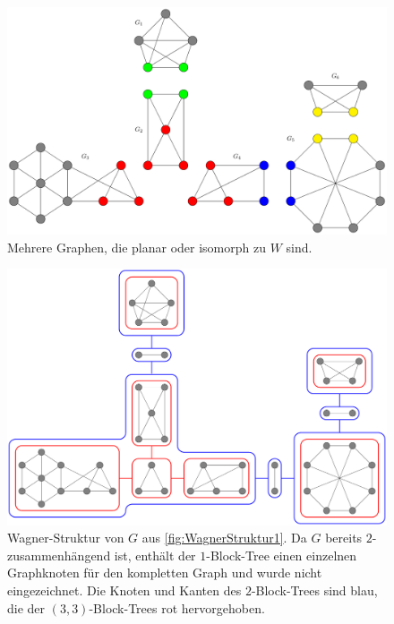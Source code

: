 \begin{figure}[H]
  \centering
  \includegraphics[width=\textwidth,height=\textheight,keepaspectratio]{bilder/WagnerTheorem2.pdf}
  \caption{Mehrere Graphen, die planar oder isomorph zu $W$ sind.}
  \label{fig:WagnerStruktur2}
\end{figure}

\begin{figure}[H]
  \centering
  \includegraphics[width=\textwidth,height=\textheight,keepaspectratio]{bilder/WagnerTheorem3.pdf}
  \caption{Wagner-Struktur von $G$ aus \Abb \ref{fig:WagnerStruktur1}.
           Da $G$ bereits $2$-zusammenhängend ist, enthält der $1$-Block-Tree einen einzelnen Graphknoten für den kompletten Graph und wurde nicht eingezeichnet.
           Die Knoten und Kanten des $2$-Block-Trees sind blau, die der $(3, 3)$-Block-Trees rot hervorgehoben.}
  \label{fig:WagnerStruktur3}
\end{figure}

